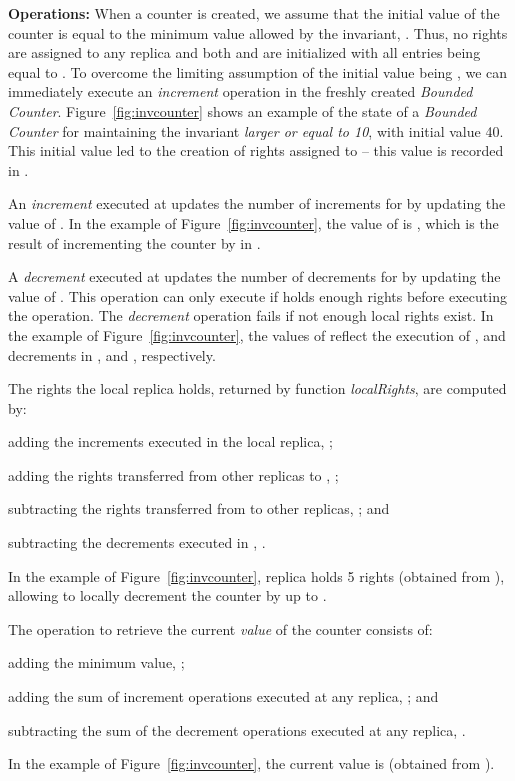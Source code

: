 \documentclass[conference]{IEEEtran}
\newcommand{\InvCounter}{\emph{Bounded Counter}}
\begin{document}
{\bf Operations:}
When a counter is created, we assume that the initial value of the 
counter is equal to the minimum value allowed by the invariant, . 
Thus, no rights are assigned to any replica and both  and  are 
initialized with all entries being equal to . 
To overcome the limiting assumption of the initial value being , 
we can immediately execute an \emph{increment} operation in the freshly 
created \InvCounter{}.
Figure~\ref{fig:invcounter} shows an example of the state of a 
\InvCounter{} for maintaining the invariant \emph{larger or equal to 10}, 
with initial value 40. This initial value led to the creation of  
rights assigned to  -- this value is recorded in . 

An \emph{increment} executed at  updates the number 
of increments for  by updating the value of .
In the example of Figure~\ref{fig:invcounter}, the value of  is , 
which is the result of incrementing the counter by  in .

A \emph{decrement} executed at  updates the number of 
decrements for  by updating the value of . 
This operation can only execute if  holds enough rights before executing
the operation. The \emph{decrement} operation fails if not enough local rights exist.
In the example of Figure~\ref{fig:invcounter}, the values of  reflect the 
execution of ,  and  decrements in ,  and , respectively.

The rights the local replica  holds, returned by function \emph{localRights},
are computed by:
\begin{inparaenum}[(a)]
\item adding the increments executed in the local replica, ;
\item adding the rights transferred from other replicas to , ;
\item subtracting the rights transferred from  to other replicas, ; and
\item subtracting the decrements executed in , .
\end{inparaenum}  
In the example of Figure~\ref{fig:invcounter}, replica  holds 5 rights
(obtained from ), allowing to locally decrement the counter
by up to .

The operation to retrieve the current \emph{value} of the counter consists 
of:
\begin{inparaenum}[(a)]
\item adding the minimum value, ;
\item adding the sum of increment operations executed at any replica, ; and
\item subtracting the sum of the decrement operations executed at any replica, .
\end{inparaenum} 
In the example of Figure~\ref{fig:invcounter}, the current value is  (obtained from ).
\end{document}
